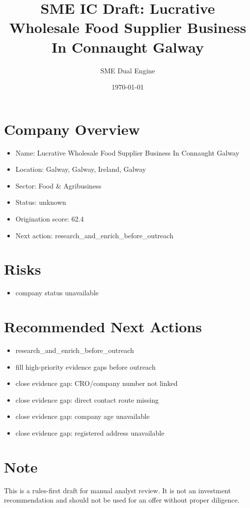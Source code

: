 \documentclass[11pt,a4paper]{article}
\title{SME IC Draft: Lucrative Wholesale Food Supplier Business In Connaught Galway}
\author{SME Dual Engine}
\date{\today}
\begin{document}
\maketitle
\section*{Company Overview}
\begin{itemize}[leftmargin=1.4em]
\item Name: Lucrative Wholesale Food Supplier Business In Connaught Galway
\item Location: Galway, Galway, Ireland, Galway
\item Sector: Food \& Agribusiness
\item Status: unknown
\item Origination score: 62.4
\item Next action: research\_and\_enrich\_before\_outreach
\end{itemize}
\section*{Risks}
\begin{itemize}[leftmargin=1.4em]
\item company status unavailable
\end{itemize}
\section*{Recommended Next Actions}
\begin{itemize}[leftmargin=1.4em]
\item research\_and\_enrich\_before\_outreach
\item fill high-priority evidence gaps before outreach
\item close evidence gap: CRO/company number not linked
\item close evidence gap: direct contact route missing
\item close evidence gap: company age unavailable
\item close evidence gap: registered address unavailable
\end{itemize}
\section*{Note}
This is a rules-first draft for manual analyst review. It is not an investment
recommendation and should not be used for an offer without proper diligence.
\end{document}
